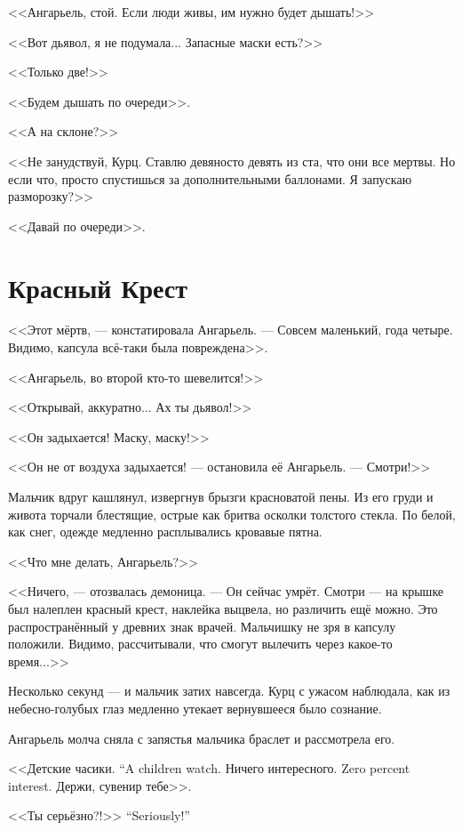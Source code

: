 <<Ангарьель, стой.
Если люди живы, им нужно будет дышать!>>

<<Вот дьявол, я не подумала...
Запасные маски есть?>>

<<Только две!>>

<<Будем дышать по очереди>>.

<<А на склоне?>>

<<Не занудствуй, Курц.
Ставлю девяносто девять из ста, что они все мертвы.
Но если что, просто спустишься за дополнительными баллонами.
Я запускаю разморозку?>>

<<Давай по очереди>>.

\section{Красный Крест}

<<Этот мёртв, --- констатировала Ангарьель.
--- Совсем маленький, года четыре.
Видимо, капсула всё-таки была повреждена>>.

<<Ангарьель, во второй кто-то шевелится!>>

<<Открывай, аккуратно... Ах ты дьявол!>>

<<Он задыхается!
Маску, маску!>>

<<Он не от воздуха задыхается! --- остановила её Ангарьель.
--- Смотри!>>

Мальчик вдруг кашлянул, извергнув брызги красноватой пены.
Из его груди и живота торчали блестящие, острые как бритва осколки толстого стекла.
По белой, как снег, одежде медленно расплывались кровавые пятна.

<<Что мне делать, Ангарьель?>>

<<Ничего, --- отозвалась демоница.
--- Он сейчас умрёт.
Смотри --- на крышке был налеплен красный крест, наклейка выцвела, но различить ещё можно.
Это распространённый у древних знак врачей.
Мальчишку не зря в капсулу положили.
Видимо, рассчитывали, что смогут вылечить через какое-то время...>>

Несколько секунд --- и мальчик затих навсегда.
Курц с ужасом наблюдала, как из небесно-голубых глаз медленно утекает вернувшееся было сознание.

Ангарьель молча сняла с запястья мальчика браслет и рассмотрела его.

{<<Детские часики.}
{``A children watch.}
{Ничего интересного.}
{Zero percent interest.}
Держи, сувенир тебе>>.

{<<Ты серьёзно?!>>}
{``Seriously!''}

